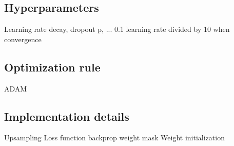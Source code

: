 \subsection{Hyperparameters}
Learning rate decay, dropout p, ...
0.1 learning rate divided by 10 when convergence

\subsection{Optimization rule}
ADAM


\subsection{Implementation details}
Upsampling
Loss function backprop weight mask
Weight initialization
